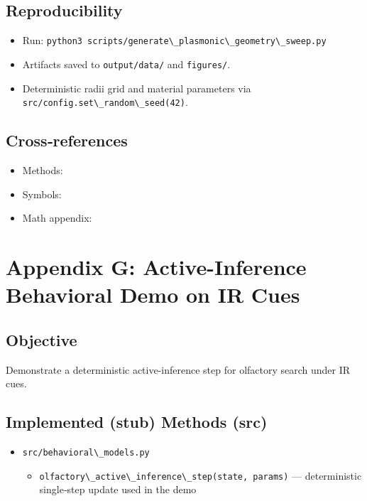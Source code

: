 \documentclass[
  13pt,
  a4paperpaper,
  12pt]{article}
\newcommand{\passthrough}[1]{#1}
\providecommand{\tightlist}{%
  \setlength{\itemsep}{0pt}\setlength{\parskip}{0pt}}
\let\oldsection\section
\renewcommand{\section}{\clearpage\oldsection}
\begin{document}
\subsection{Reproducibility}\label{reproducibility-6}

\begin{itemize}
\tightlist
\item
  Run:
  \passthrough{\lstinline!python3 scripts/generate\_plasmonic\_geometry\_sweep.py!}
\item
  Artifacts saved to \passthrough{\lstinline!output/data/!} and
  \passthrough{\lstinline!figures/!}.
\item
  Deterministic radii grid and material parameters via
  \passthrough{\lstinline!src/config.set\_random\_seed(42)!}.
\end{itemize}

\subsection{Cross‑references}\label{crossreferences-5}

\begin{itemize}
\tightlist
\item
  Methods: 
\item
  Symbols: 
\item
  Math appendix: 
\end{itemize}

\section{Appendix G: Active-Inference Behavioral Demo on IR
Cues}\label{sec:app_active_inference}

\subsection{Objective}\label{objective-6}

Demonstrate a deterministic active-inference step for olfactory search
under IR cues.

\subsection{Implemented (stub) Methods
(src)}\label{implemented-stub-methods-src}

\begin{itemize}
\tightlist
\item
  \passthrough{\lstinline!src/behavioral\_models.py!}

  \begin{itemize}
  \tightlist
  \item
    \passthrough{\lstinline!olfactory\_active\_inference\_step(state, params)!}
    --- deterministic single‑step update used in the demo
  \end{itemize}
\end{itemize}
\end{document}
